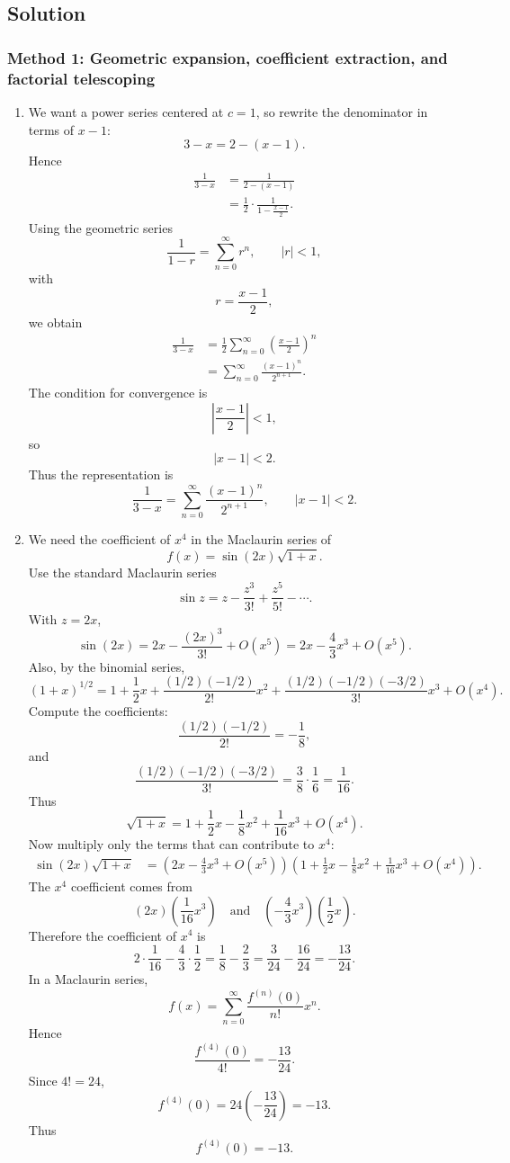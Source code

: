 \documentclass[12pt]{article}
\begin{document}
\newpage
\subsection{Solution}

\subsubsection{Method 1: Geometric expansion, coefficient extraction, and factorial telescoping}

\begin{enumerate}[label=(\alph*)]
\item We want a power series centered at $c=1$, so rewrite the denominator in terms of $x-1$:
\[
3-x=2-(x-1).
\]
Hence
\begin{align*}
\frac1{3-x}
&=\frac1{2-(x-1)}\\
&=\frac12\cdot \frac1{1-\frac{x-1}{2}}.
\end{align*}
Using the geometric series
\[
\frac1{1-r}=\sum_{n=0}^{\infty}r^n,
\qquad |r|<1,
\]
with
\[
r=\frac{x-1}{2},
\]
we obtain
\begin{align*}
\frac1{3-x}
&=\frac12\sum_{n=0}^{\infty}\left(\frac{x-1}{2}\right)^n\\
&=\sum_{n=0}^{\infty}\frac{(x-1)^n}{2^{n+1}}.
\end{align*}
The condition for convergence is
\[
\left|\frac{x-1}{2}\right|<1,
\]
so
\[
|x-1|<2.
\]
Thus the representation is
\[
\boxed{\frac1{3-x}=\sum_{n=0}^{\infty}\frac{(x-1)^n}{2^{n+1}},
\qquad |x-1|<2.}
\]

\item We need the coefficient of $x^4$ in the Maclaurin series of
\[
f(x)=\sin(2x)\sqrt{1+x}.
\]
Use the standard Maclaurin series
\[
\sin z=z-\frac{z^3}{3!}+\frac{z^5}{5!}-\cdots.
\]
With $z=2x$,
\[
\sin(2x)=2x-\frac{(2x)^3}{3!}+O(x^5)
=
2x-\frac43x^3+O(x^5).
\]
Also, by the binomial series,
\[
(1+x)^{1/2}
=
1+\frac12x+\frac{(1/2)(-1/2)}{2!}x^2
+\frac{(1/2)(-1/2)(-3/2)}{3!}x^3
+O(x^4).
\]
Compute the coefficients:
\[
\frac{(1/2)(-1/2)}{2!}=-\frac18,
\]
and
\[
\frac{(1/2)(-1/2)(-3/2)}{3!}
=
\frac{3}{8}\cdot\frac1{6}
=
\frac1{16}.
\]
Thus
\[
\sqrt{1+x}
=
1+\frac12x-\frac18x^2+\frac1{16}x^3+O(x^4).
\]
Now multiply only the terms that can contribute to $x^4$:
\begin{align*}
\sin(2x)\sqrt{1+x}
&=
\left(2x-\frac43x^3+O(x^5)\right)
\left(1+\frac12x-\frac18x^2+\frac1{16}x^3+O(x^4)\right).
\end{align*}
The $x^4$ coefficient comes from
\[
(2x)\left(\frac1{16}x^3\right)
\quad\text{and}\quad
\left(-\frac43x^3\right)\left(\frac12x\right).
\]
Therefore the coefficient of $x^4$ is
\[
2\cdot\frac1{16}-\frac43\cdot\frac12
=
\frac18-\frac23
=
\frac{3}{24}-\frac{16}{24}
=
-\frac{13}{24}.
\]
In a Maclaurin series,
\[
f(x)=\sum_{n=0}^{\infty}\frac{f^{(n)}(0)}{n!}x^n.
\]
Hence
\[
\frac{f^{(4)}(0)}{4!}=-\frac{13}{24}.
\]
Since $4!=24$,
\[
f^{(4)}(0)=24\left(-\frac{13}{24}\right)=-13.
\]
Thus
\[
\boxed{f^{(4)}(0)=-13.}
\]


\end{enumerate}
\end{document}
